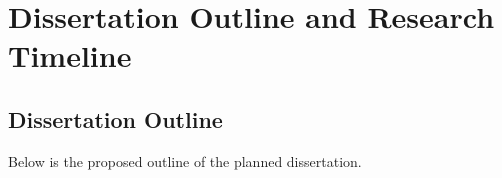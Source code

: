 \documentclass{article}
\begin{document}


\newpage



\section{Dissertation Outline and Research Timeline}
\label{Sec:Outline}

\subsection{Dissertation Outline}
Below is the proposed outline of the planned dissertation. 
\end{document}
